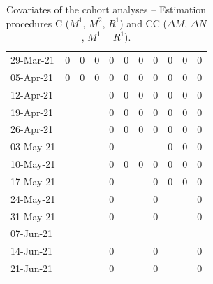 \documentclass[fleqn,10pt]{wlscirep}
\begin{document}
\begin{table}
\begin{center}
{\begin{tabular}{l|c|cc|c|cc|c|cc|c}
29-Mar-21	&$0$		&$0$	&$0$	&$0$	&$0$	&$0$	&$0$	&$0$	&$0$	&$0$	\\
05-Apr-21	&$0$		&$0$	&$0$	&$0$	&$0$	&$0$	&$0$	&$0$	&$0$	&$0$	\\
12-Apr-21	&		&	&	&$0$	&$0$	&$0$	&$0$	&$0$	&$0$	&$0$	\\
19-Apr-21	&		&	&	&$0$	&$0$	&$0$	&$0$	&$0$	&$0$	&$0$	\\
26-Apr-21	&		&	&	&$0$	&$0$	&$0$	&$0$	&$0$	&$0$	&$0$	\\
03-May-21	&		&	&	&$0$	&	&	&	&$0$	&$0$	&$0$	\\
10-May-21	&		&	&	&$0$	&$0$	&$0$	&$0$	&$0$	&$0$	&$0$	\\
17-May-21	&		&	&	&$0$	&	&	&$0$	&$0$	&$0$	&$0$	\\
24-May-21	&		&	&	&$0$	&	&	&$0$	&	&	&$0$	\\
31-May-21	&		&	&	&$0$	&	&	&$0$	&	&	&$0$	\\
07-Jun-21	&		&	&	&	&	&	&	&	&	&	\\
14-Jun-21	&		&	&	&$0$	&	&	&$0$	&	&	&$0$	\\
21-Jun-21	&		&	&	&$0$	&	&	&$0$	&	&	&$0$	\\
\end{tabular}												


}
\caption{Covariates of the cohort analyses -- Estimation procedures C ($M^1$, $M^2$, $R^1$) and CC ($\Delta M$, $\Delta N$, $M^1-R^1$).}

\label{tab:dif}
\end{center}
\end{table}
\end{document}
